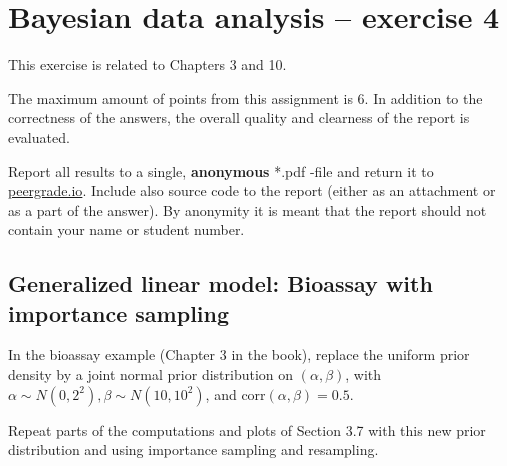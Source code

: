 \documentclass[a4paper,11pt]{article}
\begin{document}
\thispagestyle{empty}

\section*{Bayesian data analysis -- exercise 4}

This exercise is related to Chapters 3 and 10.

The maximum amount of points from this assignment is 6. In addition to the correctness of the answers, the overall quality and clearness of the report is evaluated.

Report all results to a single, {\bf anonymous} *.pdf -file and return it to \href{peergrade.io}{peergrade.io}. Include also source code to the report (either as an attachment or as a part of the answer). By anonymity it is meant that the report should not contain your name or student number.

\vspace{1cm}


\subsection*{Generalized linear model: Bioassay with importance sampling}


In the bioassay example (Chapter 3 in the book), replace the uniform prior density by a joint normal prior distribution on $(\alpha, \beta)$, with $\alpha \sim N(0,2^2), \beta \sim N(10,10^2)$, and $\mathrm{corr}(\alpha, \beta)=0.5$.

Repeat parts of the computations and plots of Section 3.7 with this new prior distribution and using importance sampling and resampling.
\end{document}
